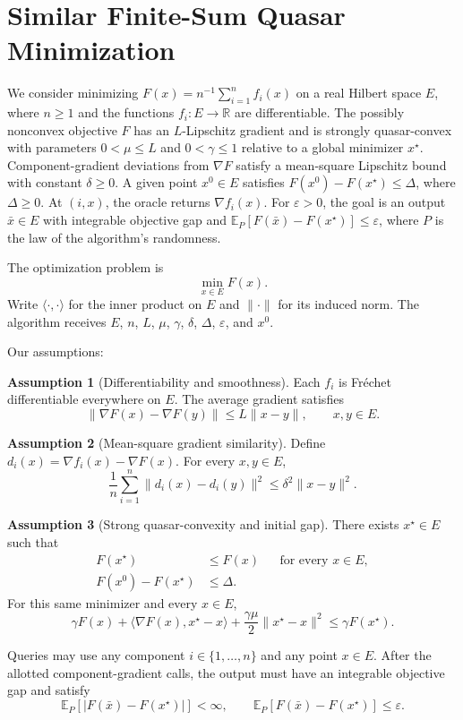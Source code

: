 \documentclass[10pt]{article}
\theoremstyle{definition}
\newtheorem{assumption}{Assumption}
\begin{document}
\section*{Similar Finite-Sum Quasar Minimization}
We consider minimizing $F(x)=n^{-1}\sum_{i=1}^n f_i(x)$ on a real Hilbert space $E$, where $n\geq1$ and the functions $f_i:E\to\mathbb{R}$ are differentiable. The possibly nonconvex objective $F$ has an $L$-Lipschitz gradient and is strongly quasar-convex with parameters $0<\mu\leq L$ and $0<\gamma\leq1$ relative to a global minimizer $x^\star$. Component-gradient deviations from $\nabla F$ satisfy a mean-square Lipschitz bound with constant $\delta\geq0$. A given point $x^0\in E$ satisfies $F(x^0)-F(x^\star)\leq\Delta$, where $\Delta\geq0$. At $(i,x)$, the oracle returns $\nabla f_i(x)$. For $\varepsilon>0$, the goal is an output $\bar{x}\in E$ with integrable objective gap and $\mathbb{E}_{P}[F(\bar{x})-F(x^\star)]\leq\varepsilon$, where $P$ is the law of the algorithm's randomness.

The optimization problem is
\[
\min_{x\in E} F(x).
\]
Write $\langle\cdot,\cdot\rangle$ for the inner product on $E$ and $\|\cdot\|$ for its induced norm. The algorithm receives $E$, $n$, $L$, $\mu$, $\gamma$, $\delta$, $\Delta$, $\varepsilon$, and $x^0$.

Our assumptions:
\begin{assumption}[Differentiability and smoothness]
Each $f_i$ is Fr\'echet differentiable everywhere on $E$. The average gradient satisfies
\[
\|\nabla F(x)-\nabla F(y)\|\leq L\|x-y\|,
\qquad x,y\in E.
\]
\end{assumption}

\begin{assumption}[Mean-square gradient similarity]
Define $d_i(x)=\nabla f_i(x)-\nabla F(x)$. For every $x,y\in E$,
\[
\frac{1}{n}\sum_{i=1}^n\|d_i(x)-d_i(y)\|^2
\leq\delta^2\|x-y\|^2.
\]
\end{assumption}

\begin{assumption}[Strong quasar-convexity and initial gap]
There exists $x^\star\in E$ such that
\[
\begin{aligned}
F(x^\star)&\leq F(x) &&\text{for every }x\in E,\\
F(x^0)-F(x^\star)&\leq\Delta.
\end{aligned}
\]
For this same minimizer and every $x\in E$,
\[
\gamma F(x)+\langle\nabla F(x),x^\star-x\rangle
+\frac{\gamma\mu}{2}\|x^\star-x\|^2
\leq\gamma F(x^\star).
\]
\end{assumption}

Queries may use any component $i\in\{1,\ldots,n\}$ and any point $x\in E$. After the allotted component-gradient calls, the output must have an integrable objective gap and satisfy
\[
\mathbb{E}_{P}\!\left[\left|F(\bar{x})-F(x^\star)\right|\right]<\infty,
\qquad
\mathbb{E}_{P}[F(\bar{x})-F(x^\star)]\leq\varepsilon.
\]
\end{document}
